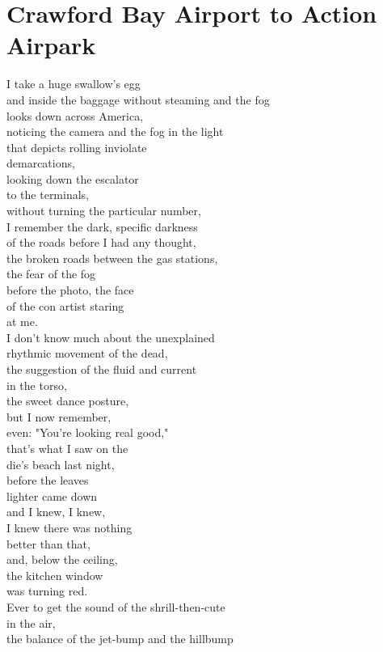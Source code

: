 \documentclass[smalldemyvopaper,11pt,twoside,onecolumn,openright,extrafontsizes]{memoir}
\begin{document}
\chapter{Crawford Bay Airport to Action Airpark}
I take a huge swallow's egg
\\and inside the baggage without steaming and the fog
\\looks down across America,
\\noticing the camera and the fog in the light
\\that depicts rolling inviolate
\\demarcations,
\\looking down the escalator
\\to the terminals,
\\without turning the particular number,
\\I remember the dark, specific darkness
\\of the roads before I had any thought,
\\the broken roads between the gas stations,
\\the fear of the fog
\\before the photo, the face
\\of the con artist staring
\\at me.
\\I don't know much about the unexplained
\\rhythmic movement of the dead,
\\the suggestion of the fluid and current
\\in the torso,
\\the sweet dance posture,
\\but I now remember,
\\even: "You're looking real good,"
\\that's what I saw on the
\\die's beach last night,
\\before the leaves
\\lighter came down
\\and I knew, I knew,
\\I knew there was nothing
\\better than that,
\\and, below the ceiling,
\\the kitchen window
\\was turning red.
\\Ever to get the sound of the shrill-then-cute
\\in the air,
\\the balance of the jet-bump and the hillbump
\end{document}
